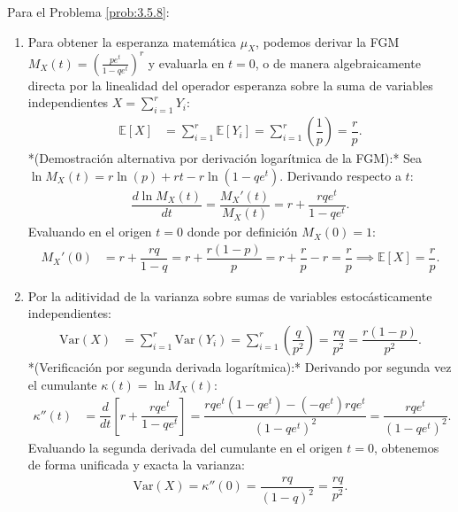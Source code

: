 \begin{solucion}
	\label{sol:3.5.8}
	Para el Problema \ref{prob:3.5.8}:
	\begin{enumerate}
		\item Para obtener la esperanza matemática $\mu_X$, podemos derivar la FGM $M_X(t) = \left(\frac{p e^t}{1 - q e^t}\right)^r$ y evaluarla en $t=0$, o de manera algebraicamente directa por la linealidad del operador esperanza sobre la suma de variables independientes $X = \sum_{i=1}^r Y_i$:
		\begin{align*}
			\mathbb{E}[X] &= \sum_{i=1}^r \mathbb{E}[Y_i] = \sum_{i=1}^r \left(\dfrac{1}{p}\right) = \dfrac{r}{p}.
		\end{align*}
		*(Demostración alternativa por derivación logarítmica de la FGM):* Sea $\ln M_X(t) = r \ln(p) + r t - r \ln(1 - q e^t)$. Derivando respecto a $t$:
		\begin{align*}
			\dfrac{d \ln M_X(t)}{dt} = \dfrac{M_X'(t)}{M_X(t)} = r + \dfrac{r q e^t}{1 - q e^t}.
		\end{align*}
		Evaluando en el origen $t = 0$ donde por definición $M_X(0) = 1$:
		\begin{align*}
			M_X'(0) &= r + \dfrac{r q}{1 - q} = r + \dfrac{r(1-p)}{p} = r + \dfrac{r}{p} - r = \dfrac{r}{p} \implies \mathbb{E}[X] = \dfrac{r}{p}.
		\end{align*}
		\item Por la aditividad de la varianza sobre sumas de variables estocásticamente independientes:
		\begin{align*}
			\text{Var}(X) &= \sum_{i=1}^r \text{Var}(Y_i) = \sum_{i=1}^r \left(\dfrac{q}{p^2}\right) = \dfrac{r q}{p^2} = \dfrac{r(1-p)}{p^2}.
		\end{align*}
		*(Verificación por segunda derivada logarítmica):* Derivando por segunda vez el cumulante $\kappa(t) = \ln M_X(t)$:
		\begin{align*}
			\kappa''(t) &= \dfrac{d}{dt} \left[ r + \dfrac{r q e^t}{1 - q e^t} \right] = \dfrac{r q e^t (1 - q e^t) - (-q e^t) r q e^t}{(1 - q e^t)^2} = \dfrac{r q e^t}{(1 - q e^t)^2}.
		\end{align*}
		Evaluando la segunda derivada del cumulante en el origen $t = 0$, obtenemos de forma unificada y exacta la varianza:
		\begin{align*}
			\text{Var}(X) = \kappa''(0) = \dfrac{r q}{(1 - q)^2} = \dfrac{r q}{p^2}.
		\end{align*}
	\end{enumerate}
\end{solucion}

